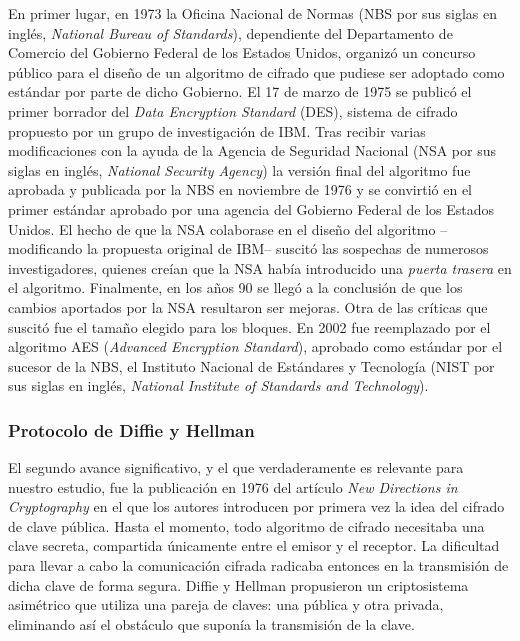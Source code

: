 \documentclass[
  a4paper,
  12pt,
  spanish,
]{scrartcl}
\begin{document}
En primer lugar, en 1973 la Oficina Nacional de Normas (NBS por sus siglas en inglés, \textit{National Bureau of Standards}), dependiente del Departamento de Comercio del Gobierno Federal de los Estados Unidos, organizó un concurso público para el diseño de un algoritmo de cifrado que pudiese ser adoptado como estándar por parte de dicho Gobierno. 
El 17 de marzo de 1975 se publicó el primer borrador del \textit{Data Encryption Standard} (DES), sistema de cifrado propuesto por un grupo de investigación de IBM.
Tras recibir varias modificaciones con la ayuda de la Agencia de Seguridad Nacional (NSA por sus siglas en inglés, \textit{National Security Agency}) la versión final del algoritmo fue aprobada y publicada por la NBS en noviembre de 1976 y se convirtió en el primer estándar aprobado por una agencia del Gobierno Federal de los Estados Unidos. 
El hecho de que la NSA colaborase en el diseño del algoritmo --modificando la propuesta original de IBM-- suscitó las sospechas de numerosos investigadores, quienes creían que la NSA había introducido una \textit{puerta trasera} en el algoritmo. 
Finalmente, en los años 90 se llegó a la conclusión de que los cambios aportados por la NSA resultaron ser mejoras. %
Otra de las críticas que suscitó fue el tamaño elegido para los bloques.
En 2002 fue reemplazado por el algoritmo AES (\textit{Advanced Encryption Standard}), aprobado como estándar por el sucesor de la NBS, el Instituto Nacional de Estándares y Tecnología (NIST por sus siglas en inglés, \textit{National Institute of Standards and Technology}).

\subsubsection{Protocolo de Diffie y Hellman}

El segundo avance significativo, y el que verdaderamente es relevante para nuestro estudio, fue la publicación en 1976 del artículo \textit{New Directions in Cryptography} \parencite{diffie_new_1976} en el que los autores introducen por primera vez la idea del cifrado de clave pública. 
Hasta el momento, todo algoritmo de cifrado necesitaba una clave secreta, compartida únicamente entre el emisor y el receptor. 
La dificultad para llevar a cabo la comunicación cifrada radicaba entonces en la transmisión de dicha clave de forma segura. 
Diffie y Hellman propusieron un criptosistema asimétrico que utiliza una pareja de claves: una pública y otra privada, eliminando así el obstáculo que suponía la transmisión de la clave.
\end{document}
